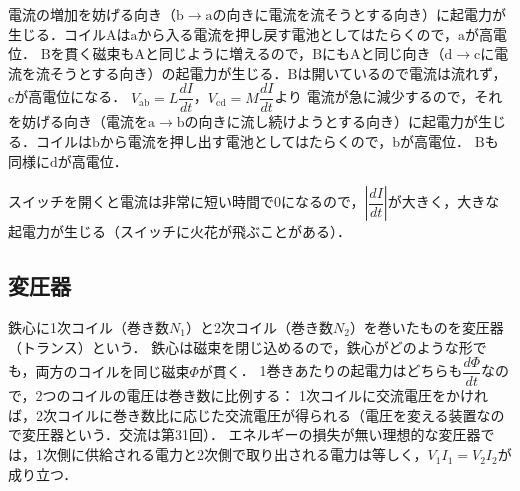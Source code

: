 \begin{reidaiunit}
\begin{kaitou}
\begin{komon}
 電流の増加を妨げる向き（$\mathrm{b}\to\mathrm{a}$の向きに電流を流そうとする向き）に起電力が生じる．コイル$\mathrm{A}$は$\mathrm{a}$から入る電流を押し戻す電池としてはたらくので，{\gtfamily $\mathrm{a}$}が高電位．\Ans
{} $\mathrm{B}$を貫く磁束も$\mathrm{A}$と同じように増えるので，$\mathrm{B}$にも$\mathrm{A}$と同じ向き（$\mathrm{d}\to\mathrm{c}$に電流を流そうとする向き）の起電力が生じる．$\mathrm{B}$は開いているので電流は流れず，{\gtfamily $\mathrm{c}$}が高電位になる．\Ans
{} $V_{\mathrm{ab}}=L\dfrac{dI}{dt}$，$V_{\mathrm{cd}}=M\dfrac{dI}{dt}$より
 電流が急に減少するので，それを妨げる向き（電流を$\mathrm{a}\to\mathrm{b}$の向きに流し続けようとする向き）に起電力が生じる．コイルは$\mathrm{b}$から電流を押し出す電池としてはたらくので，{\gtfamily $\mathrm{b}$}が高電位．\Ans
{} $\mathrm{B}$も同様に{\gtfamily $\mathrm{d}$}が高電位．\Ans
       \begin{chuu}
       スイッチを開くと電流は非常に短い時間で$0$になるので，$\left|\dfrac{dI}{dt}\right|$が大きく，大きな起電力が生じる（スイッチに火花が飛ぶことがある）．
       \end{chuu}
\end{komon}
\end{kaitou}
\end{reidaiunit}

\subsection{変圧器}

鉄心に1次コイル（巻き数$N_1$）と2次コイル（巻き数$N_2$）を巻いたものを{\gtfamily 変圧器（トランス）}という．
鉄心は磁束を閉じ込めるので，鉄心がどのような形でも，{\gtfamily 両方のコイルを同じ磁束$\varPhi$が貫く}．
1巻きあたりの起電力はどちらも$\dfrac{d\varPhi}{dt}$なので，2つのコイルの電圧は巻き数に比例する：
1次コイルに交流電圧をかければ，2次コイルに巻き数比に応じた交流電圧が得られる（電圧を変える装置なので変圧器という．交流は第31回）．
エネルギーの損失が無い理想的な変圧器では，1次側に供給される電力と2次側で取り出される電力は等しく，$V_1I_1=V_2I_2$が成り立つ．

\newpage

\setcounter{qno}{98}


